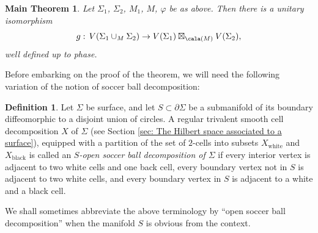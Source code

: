 \documentclass[a4paper,10pt,leqno]{amsart}
\theoremstyle{plain}
\newtheorem{maintheorem}[theorem]{Main Theorem}
\theoremstyle{definition}
\newtheorem{definition}[theorem]{Definition}
\theoremstyle{remark}
\begin{document}
\begin{maintheorem}\label{maintheorem gluing}
Let $\Sigma_1$, $\Sigma_2$, $M_1$, $M$, $\varphi$ be as above.
Then there is a unitary isomorphism
\begin{equation}\label{eq: main thm eq2}
g:\,V(\Sigma_1\cup_M \Sigma_2)\to V(\Sigma_1)\boxtimes_{\cala(M)} V(\Sigma_2),
\end{equation}
well defined up to phase.
\end{maintheorem}

Before embarking on the proof of the theorem, we will need the following variation of the notion of soccer ball decomposition:

\begin{definition}
Let $\Sigma$ be surface, and let $S\subset \partial \Sigma$ 
be a submanifold of its boundary diffeomorphic to a disjoint union of circles.
A regular trivalent smooth cell decomposition $X$ of $\Sigma$ 
(see Section \ref{sec: The Hilbert space associated to a surface}), equipped with a partition of the set 
of $2$-cells into subsets $X_{\mathrm{white}}$ and $X_{\mathrm{black}}$ is called an 
\emph{$S$-open soccer ball decomposition of $\Sigma$}
if every interior vertex is adjacent to two white cells and one back cell, 
every boundary vertex not in $S$ is adjacent to two white cells, and 
every boundary vertex  in $S$ is adjacent to a white and a black cell.
\end{definition}

We shall sometimes abbreviate the above terminology by ``open soccer ball decomposition'' when the manifold $S$ is obvious from the context.
\end{document}
